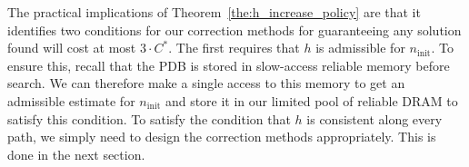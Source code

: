 \documentclass[letterpaper]{article}
\begin{document}
%
%
%




The practical implications of Theorem~\ref{the:h_increase_policy} are that it identifies two conditions for our correction methods for guaranteeing any solution found will cost at most $3 \cdot C^*$. The first requires that $h$ is admissible for $n_{\mathrm{init}}$. To ensure this, recall that the PDB is stored in slow-access reliable memory before search.
We can therefore make a single access to this memory to get an admissible estimate for $n_{\mathrm{init}}$ and store it in our limited pool of reliable DRAM to satisfy this condition. 
To satisfy the condition that $h$ is consistent along every path, we simply need to design the correction methods appropriately. This is done in the next section.
\end{document}
